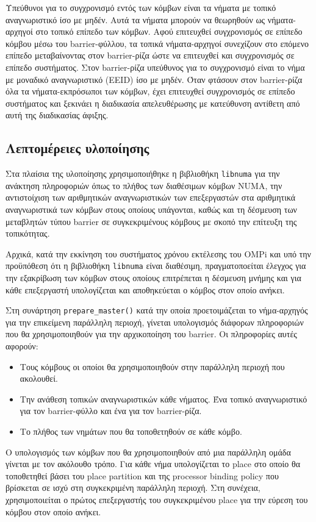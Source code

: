 Υπεύθυνοι για το συγχρονισμό εντός των κόμβων είναι τα νήματα με τοπικό αναγνωριστικό ίσο με μηδέν. Αυτά τα νήματα μπορούν να θεωρηθούν ως νήματα-αρχηγοί στο τοπικό επίπεδο των κόμβων. Αφού επιτευχθεί συγχρονισμός σε επίπεδο κόμβου μέσω του barrier-φύλλου, τα τοπικά νήματα-αρχηγοί συνεχίζουν στο επόμενο επίπεδο μεταβαίνοντας στον barrier-ρίζα ώστε να επιτευχθεί και συγχρονισμός σε επίπεδο συστήματος. Στον barrier-ρίζα υπεύθυνος για το συγχρονισμό είναι το νήμα με μοναδικό αναγνωριστικό (EEID) ίσο με μηδέν. Όταν φτάσουν στον barrier-ρίζα όλα τα νήματα-εκπρόσωποι των κόμβων, έχει επιτευχθεί συγχρονισμός σε επίπεδο συστήματος και ξεκινάει η διαδικασία απελευθέρωσης με κατεύθυνση αντίθετη από αυτή της διαδικασίας άφιξης.

\subsection{Λεπτομέρειες υλοποίησης}
Στα πλαίσια της υλοποίησης χρησιμοποιήθηκε η βιβλιοθήκη \texttt{libnuma} για την ανάκτηση πληροφοριών όπως το πλήθος των διαθέσιμων κόμβων NUMA, την αντιστοίχιση των αριθμητικών αναγνωριστικών των επεξεργαστών στα αριθμητικά αναγνωριστικά των κόμβων στους οποίους υπάγονται, καθώς και τη δέσμευση των μεταβλητών τύπου barrier σε συγκεκριμένους κόμβους με σκοπό την επίτευξη της τοπικότητας.

Αρχικά, κατά την εκκίνηση του συστήματος χρόνου εκτέλεσης του OMPi και υπό την προϋπόθεση ότι η βιβλιοθήκη \texttt{libnuma} είναι διαθέσιμη, πραγματοποείται έλεγχος για την εξακρίβωση των κόμβων στους οποίους επιτρέπεται η δέσμευση μνήμης και για κάθε επεξεργαστή υπολογίζεται και αποθηκεύεται ο κόμβος στον οποίο ανήκει.

Στη συνάρτηση \texttt{prepare\_master()} κατά την οποία προετοιμάζεται το νήμα-αρχηγός για την επικείμενη παράλληλη περιοχή, γίνεται υπολογισμός διάφορων πληροφοριών που θα χρησιμοποιηθούν για την αρχικοποίηση του barrier. Οι πληροφορίες αυτές αφορούν:
\begin{itemize}
	\item Τους κόμβους οι οποίοι θα χρησιμοποιηθούν στην παράλληλη περιοχή που ακολουθεί.
	\item Την ανάθεση τοπικών αναγνωριστικών κάθε νήματος. Ένα τοπικό αναγνωριστικό για τον barrier-φύλλο και ένα για τον barrier-ρίζα.
	\item Το πλήθος των νημάτων που θα τοποθετηθούν σε κάθε κόμβο. 
\end{itemize}

Ο υπολογισμός των κόμβων που θα χρησιμοποιηθούν από μια παράλληλη ομάδα γίνεται με τον ακόλουθο τρόπο. Για κάθε νήμα υπολογίζεται το place στο οποίο θα τοποθετηθεί βάσει του place partition και της processor binding policy που βρίσκεται σε ισχύ στη συγκεκριμένη παράλληλη περιοχή. Στη συνέχεια, χρησιμοποιείται ο πρώτος επεξεργαστής του συγκεκριμένου place για την εύρεση του κόμβου στον οποίο ανήκει.

